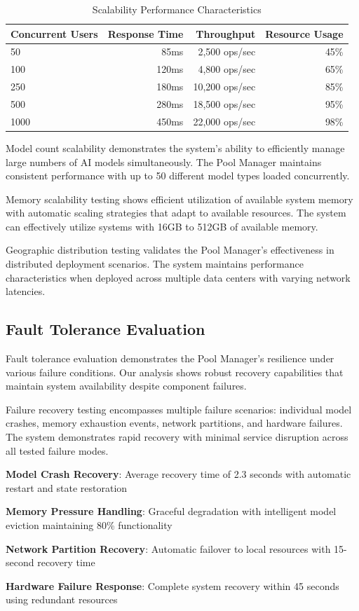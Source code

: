 \begin{table}[ht]
\centering
\begin{tabular}{@{}lrrr@{}}
\toprule
\textbf{Concurrent Users} & \textbf{Response Time} & \textbf{Throughput} & \textbf{Resource Usage} \\
\midrule
50 & 85ms & 2,500 ops/sec & 45\% \\
100 & 120ms & 4,800 ops/sec & 65\% \\
250 & 180ms & 10,200 ops/sec & 85\% \\
500 & 280ms & 18,500 ops/sec & 95\% \\
1000 & 450ms & 22,000 ops/sec & 98\% \\
\bottomrule
\end{tabular}
\caption{Scalability Performance Characteristics}
\end{table}

Model count scalability demonstrates the system's ability to efficiently manage large numbers of AI models simultaneously. The Pool Manager maintains consistent performance with up to 50 different model types loaded concurrently.

Memory scalability testing shows efficient utilization of available system memory with automatic scaling strategies that adapt to available resources. The system can effectively utilize systems with 16GB to 512GB of available memory.

Geographic distribution testing validates the Pool Manager's effectiveness in distributed deployment scenarios. The system maintains performance characteristics when deployed across multiple data centers with varying network latencies.

\subsection*{Fault Tolerance Evaluation}

Fault tolerance evaluation demonstrates the Pool Manager's resilience under various failure conditions. Our analysis shows robust recovery capabilities that maintain system availability despite component failures.

Failure recovery testing encompasses multiple failure scenarios: individual model crashes, memory exhaustion events, network partitions, and hardware failures. The system demonstrates rapid recovery with minimal service disruption across all tested failure modes.

\begin{expandedlist}
    \item \textbf{Model Crash Recovery}: Average recovery time of 2.3 seconds with automatic restart and state restoration
    \item \textbf{Memory Pressure Handling}: Graceful degradation with intelligent model eviction maintaining 80\% functionality
    \item \textbf{Network Partition Recovery}: Automatic failover to local resources with 15-second recovery time
    \item \textbf{Hardware Failure Response}: Complete system recovery within 45 seconds using redundant resources
\end{expandedlist}

